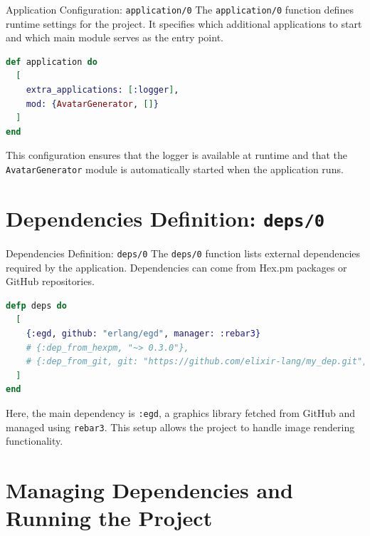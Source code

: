 \documentclass[aspectratio=169, table]{beamer}
\begin{document}
\begin{frame}[fragile]{Application Configuration: \texttt{application/0}}
\vspace{20pt}
\small
The \texttt{application/0} function defines runtime settings for the project.  
It specifies which additional applications to start and which main module serves as the entry point.

\begin{lstlisting}[language=Elixir, basicstyle=\ttfamily\scriptsize]
def application do
  [
    extra_applications: [:logger],
    mod: {AvatarGenerator, []}
  ]
end
\end{lstlisting}

This configuration ensures that the logger is available at runtime and  
that the \texttt{AvatarGenerator} module is automatically started when the application runs.
\end{frame}

\section{Dependencies Definition: \texttt{deps/0}}

\begin{frame}[fragile]{Dependencies Definition: \texttt{deps/0}}
\vspace{20pt}
\small
The \texttt{deps/0} function lists external dependencies required by the application.  
Dependencies can come from Hex.pm packages or GitHub repositories.

\begin{lstlisting}[language=Elixir, basicstyle=\ttfamily\scriptsize]
defp deps do
  [
    {:egd, github: "erlang/egd", manager: :rebar3}
    # {:dep_from_hexpm, "~> 0.3.0"},
    # {:dep_from_git, git: "https://github.com/elixir-lang/my_dep.git", tag: "0.1.0"}
  ]
end
\end{lstlisting}

Here, the main dependency is \texttt{:egd}, a graphics library fetched  
from GitHub and managed using \texttt{rebar3}.  
This setup allows the project to handle image rendering functionality.
\end{frame}


\section{Managing Dependencies and Running the Project}
\end{document}
